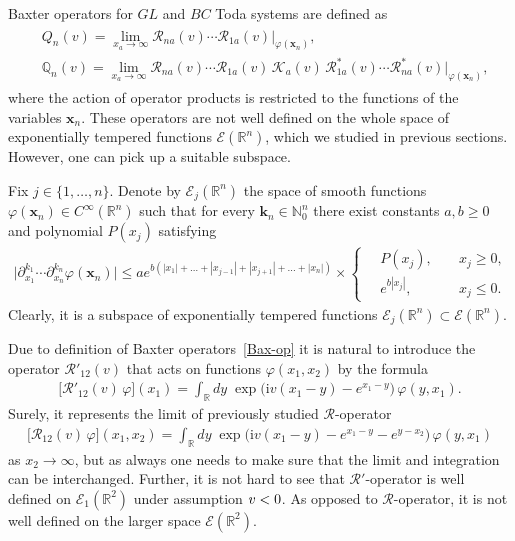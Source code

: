 \documentclass[11pt]{article}
\numberwithin{equation}{section}
\theoremstyle{plain}
\theoremstyle{definition}
\newcommand{\QQ}{\mathbb{Q}}
\let\Im\relax
\DeclareMathOperator{\Im}{Im}
\renewcommand{\phi}{\varphi}
\renewcommand{\imath}{\mathrm{i}}
\begin{document}
Baxter operators for $GL$ and $BC$ Toda systems are defined as
\begin{align} \label{Bax-op}
	\begin{aligned}
		& Q_n(v) = \lim_{x_a \to \infty} \mathcal{R}_{na}(v) \cdots \mathcal{R}_{1a}(v) \bigr|_{\phi(\bm{x}_n)}, \\[6pt]
		& \QQ_n(v) = \lim_{x_a \to \infty}  \mathcal{R}_{na}(v) \cdots \mathcal{R}_{1a}(v) \, \mathcal{K}_a(v) \, \mathcal{R}^*_{1a}(v) \cdots \mathcal{R}^*_{na}(v) \bigr|_{\phi(\bm{x}_n)},
	\end{aligned}
\end{align}
where the action of operator products is restricted to the functions of the variables $\bm{x}_n$. These operators are not well defined on the whole space of exponentially tempered functions $\mathcal{E}(\mathbb{R}^{n})$,  which we studied in previous sections. However, one can pick up a suitable subspace.

Fix $j \in \{1, \dots, n\}$. Denote by $\mathcal{E}_j(\mathbb{R}^n)$ the space of smooth functions $\phi(\bm{x}_n) \in C^{\infty}(\mathbb{R}^n)$ such that for every $\bm{k}_n \in \mathbb{N}_0^n$ there exist constants $a, b \geq 0$ and polynomial $P(x_j)$ satisfying
\begin{align}
	\bigl| \partial_{x_1}^{k_1} \cdots \partial_{x_n}^{k_n} \phi(\bm{x}_n) \bigr| \leq a e^{b(|x_1| + \ldots +|x_{j - 1}| + |x_{j + 1}| + \ldots + |x_n|)} \times
	\left\{ \begin{aligned}
		& \, P(x_j), && \; x_j \geq 0, \\[6pt]
		& \, e^{b |x_j|}, && \; x_j \leq 0.
	\end{aligned}  \right.
\end{align}
Clearly, it is a subspace of exponentially tempered functions $\mathcal{E}_j(\mathbb{R}^n) \subset \mathcal{E}(\mathbb{R}^n)$. 

Due to definition of Baxter operators~\eqref{Bax-op} it is natural to introduce the operator $\mathcal{R}'_{12}(v)$ that acts on functions $\phi(x_1, x_2)$ by the formula
\begin{align} \label{R'phi}
	\bigl[ \mathcal{R}'_{12}(v) \, \phi \bigr] (x_1) = \int_{\mathbb{R}} dy \; \exp \bigl( \imath v(x_1 - y) - e^{x_1 - y} \bigr) \, \phi(y, x_1).
\end{align}
Surely, it represents the limit of previously studied $\mathcal{R}$-operator
\begin{align}
	\bigl[ \mathcal{R}_{12}(v) \, \phi \bigr] (x_1, x_2) = \int_{\mathbb{R}} dy \; \exp \bigl( \imath v(x_1 - y) - e^{x_1 - y} - e^{y - x_2} \bigr) \, \phi(y, x_1)
\end{align}
as $x_2 \to \infty$, but as always one needs to make sure that the limit and integration can be interchanged. Further, it is not hard to see that \mbox{$\mathcal{R}'$-operator} is well defined on $\mathcal{E}_1(\mathbb{R}^2)$ under assumption $\Im v < 0$. As opposed to $\mathcal{R}$-operator, it is not well defined on the larger space $\mathcal{E}(\mathbb{R}^2)$.
\end{document}
